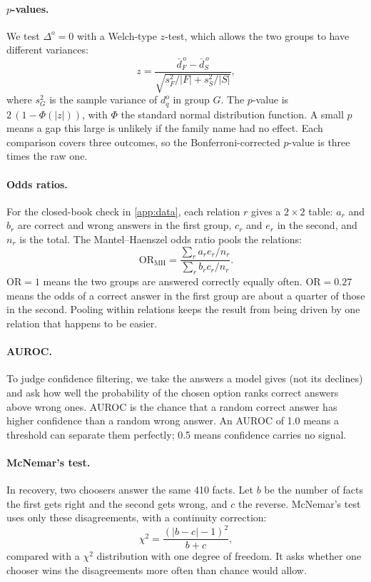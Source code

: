 \paragraph{$p$-values.}
We test $\Delta^o=0$ with a Welch-type $z$-test, which allows the two groups to have different variances:
\begin{equation}
z=\frac{\bar d^{\,o}_F-\bar d^{\,o}_S}{\sqrt{s_F^2/|F|+s_S^2/|S|}},
\end{equation}
where $s_G^2$ is the sample variance of $d_q^o$ in group $G$. The $p$-value is $2\,(1-\Phi(|z|))$, with $\Phi$ the standard normal distribution function. A small $p$ means a gap this large is unlikely if the family name had no effect. Each comparison covers three outcomes, so the Bonferroni-corrected $p$-value is three times the raw one.

\paragraph{Odds ratios.}
For the closed-book check in \cref{app:data}, each relation $r$ gives a $2\times2$ table: $a_r$ and $b_r$ are correct and wrong answers in the first group, $c_r$ and $e_r$ in the second, and $n_r$ is the total. The Mantel--Haenszel odds ratio pools the relations:
\begin{equation}
\mathrm{OR}_{\mathrm{MH}}=\frac{\sum_r a_r e_r/n_r}{\sum_r b_r c_r/n_r}.
\end{equation}
$\mathrm{OR}=1$ means the two groups are answered correctly equally often. $\mathrm{OR}=0.27$ means the odds of a correct answer in the first group are about a quarter of those in the second. Pooling within relations keeps the result from being driven by one relation that happens to be easier.

\paragraph{AUROC.}
To judge confidence filtering, we take the answers a model gives (not its declines) and ask how well the probability of the chosen option ranks correct answers above wrong ones. AUROC is the chance that a random correct answer has higher confidence than a random wrong answer. An AUROC of 1.0 means a threshold can separate them perfectly; 0.5 means confidence carries no signal.

\paragraph{McNemar's test.}
In recovery, two choosers answer the same 410 facts. Let $b$ be the number of facts the first gets right and the second gets wrong, and $c$ the reverse. McNemar's test uses only these disagreements, with a continuity correction:
\begin{equation}
\chi^2=\frac{(|b-c|-1)^2}{b+c},
\end{equation}
compared with a $\chi^2$ distribution with one degree of freedom. It asks whether one chooser wins the disagreements more often than chance would allow.
